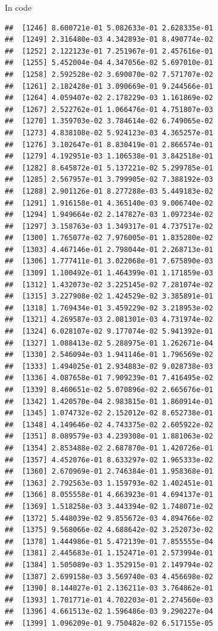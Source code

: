 \documentclass[ignorenonframetext,]{beamer}
\begin{document}
\begin{frame}[fragile]{In code}
\begin{verbatim}
##  [1246] 8.600721e-01 5.082633e-01 2.628335e-01
##  [1249] 2.316480e-03 4.342893e-01 8.490774e-02
##  [1252] 2.122123e-01 7.251967e-01 2.457616e-01
##  [1255] 5.452004e-04 4.347056e-02 5.697010e-01
##  [1258] 2.592528e-02 3.690070e-02 7.571707e-02
##  [1261] 2.182428e-01 3.090669e-01 9.244566e-01
##  [1264] 4.059407e-02 2.178229e-03 1.161869e-02
##  [1267] 2.522762e-01 1.066476e-01 4.751807e-03
##  [1270] 1.359703e-02 3.784614e-02 6.749065e-02
##  [1273] 4.838108e-02 5.924123e-03 4.365257e-01
##  [1276] 3.102647e-01 8.830419e-01 2.866574e-01
##  [1279] 4.192951e-03 1.106538e-01 3.842518e-01
##  [1282] 8.645872e-01 5.137221e-02 5.299785e-01
##  [1285] 2.567957e-01 3.799905e-02 7.388192e-03
##  [1288] 2.901126e-01 8.277288e-03 5.449183e-02
##  [1291] 1.916158e-01 4.365140e-03 9.006740e-02
##  [1294] 1.949664e-02 2.147827e-03 1.097234e-02
##  [1297] 3.158763e-03 1.349317e-01 4.737517e-02
##  [1300] 1.765077e-02 7.976005e-01 1.835280e-02
##  [1303] 4.467146e-01 2.798044e-01 2.268713e-01
##  [1306] 1.777411e-01 3.022068e-01 7.675890e-03
##  [1309] 1.100492e-01 1.464399e-01 1.171859e-03
##  [1312] 1.432073e-02 3.225145e-02 7.281074e-02
##  [1315] 3.227908e-02 1.424529e-02 3.385891e-01
##  [1318] 1.769434e-01 3.459229e-02 3.218953e-02
##  [1321] 4.269587e-03 2.081301e-03 4.731974e-02
##  [1324] 6.028107e-02 9.177074e-02 5.941392e-01
##  [1327] 1.088413e-02 5.288975e-01 1.262671e-04
##  [1330] 2.546094e-03 1.941146e-01 1.796569e-02
##  [1333] 1.494025e-01 2.934883e-02 9.028738e-03
##  [1336] 4.087658e-01 7.909239e-01 7.416495e-02
##  [1339] 8.460651e-02 5.070896e-02 2.665676e-01
##  [1342] 1.420570e-04 2.983815e-01 1.860914e-01
##  [1345] 1.074732e-02 2.152012e-02 8.652738e-01
##  [1348] 4.149646e-02 4.743375e-02 2.605922e-02
##  [1351] 8.089579e-03 4.239308e-01 1.881063e-02
##  [1354] 2.853488e-02 2.687870e-01 1.420726e-01
##  [1357] 4.452076e-01 8.633297e-02 1.965333e-02
##  [1360] 2.670969e-01 2.746384e-01 1.958368e-01
##  [1363] 2.792563e-03 1.159793e-02 1.402451e-01
##  [1366] 8.055558e-01 4.663923e-01 4.694137e-01
##  [1369] 1.518258e-03 3.443394e-02 1.748071e-02
##  [1372] 5.448039e-02 9.855672e-03 4.894766e-02
##  [1375] 9.568066e-02 4.688642e-02 3.252073e-02
##  [1378] 1.444986e-01 5.472139e-01 7.855555e-04
##  [1381] 2.445683e-01 1.152471e-01 2.573994e-01
##  [1384] 1.505089e-03 1.352915e-01 2.149794e-02
##  [1387] 2.699158e-03 3.569740e-03 4.456698e-02
##  [1390] 8.144027e-01 2.136211e-03 3.764862e-01
##  [1393] 1.701771e-01 4.702203e-01 2.274560e-03
##  [1396] 4.661513e-02 1.596486e-03 9.290227e-04
##  [1399] 1.096209e-01 9.750482e-02 6.517155e-05

\end{verbatim}
\end{frame}
\end{document}
